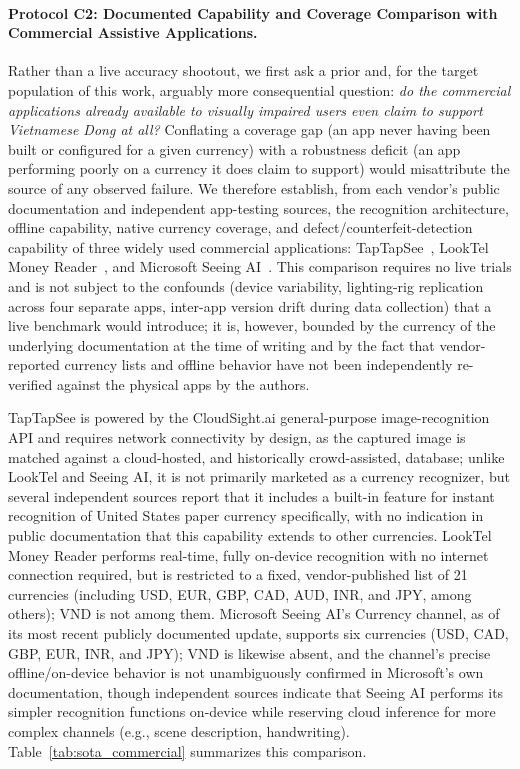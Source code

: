 \documentclass[final,5p,times,twocolumn,authoryear]{elsarticle}
\begin{document}
\paragraph{Protocol C2: Documented Capability and Coverage Comparison with Commercial Assistive Applications.}
Rather than a live accuracy shootout, we first ask a prior and, for the target population of this work, arguably more consequential question: \emph{do the commercial applications already available to visually impaired users even claim to support Vietnamese Dong at all?} Conflating a coverage gap (an app never having been built or configured for a given currency) with a robustness deficit (an app performing poorly on a currency it does claim to support) would misattribute the source of any observed failure. We therefore establish, from each vendor's public documentation and independent app-testing sources, the recognition architecture, offline capability, native currency coverage, and defect/counterfeit-detection capability of three widely used commercial applications: TapTapSee~\cite{TapTapSee}, LookTel Money Reader~\cite{LookTel}, and Microsoft Seeing AI~\cite{SeeingAI}. This comparison requires no live trials and is not subject to the confounds (device variability, lighting-rig replication across four separate apps, inter-app version drift during data collection) that a live benchmark would introduce; it is, however, bounded by the currency of the underlying documentation at the time of writing and by the fact that vendor-reported currency lists and offline behavior have not been independently re-verified against the physical apps by the authors.

TapTapSee is powered by the CloudSight.ai general-purpose image-recognition API and requires network connectivity by design, as the captured image is matched against a cloud-hosted, and historically crowd-assisted, database; unlike LookTel and Seeing AI, it is not primarily marketed as a currency recognizer, but several independent sources report that it includes a built-in feature for instant recognition of United States paper currency specifically, with no indication in public documentation that this capability extends to other currencies. LookTel Money Reader performs real-time, fully on-device recognition with no internet connection required, but is restricted to a fixed, vendor-published list of 21 currencies (including USD, EUR, GBP, CAD, AUD, INR, and JPY, among others); VND is not among them. Microsoft Seeing AI's Currency channel, as of its most recent publicly documented update, supports six currencies (USD, CAD, GBP, EUR, INR, and JPY); VND is likewise absent, and the channel's precise offline/on-device behavior is not unambiguously confirmed in Microsoft's own documentation, though independent sources indicate that Seeing AI performs its simpler recognition functions on-device while reserving cloud inference for more complex channels (e.g., scene description, handwriting). Table~\ref{tab:sota_commercial} summarizes this comparison.
\end{document}
